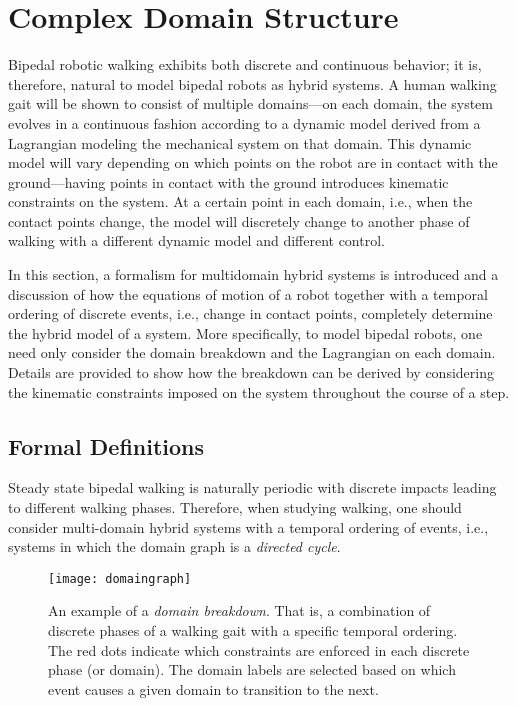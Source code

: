 \section{Complex Domain Structure}
Bipedal robotic walking exhibits both discrete and continuous behavior; it is,
therefore, natural to model bipedal robots as hybrid systems.
%
A human walking gait will be shown to consist of multiple domains---on each
domain, the system evolves in a continuous fashion according to a dynamic model
derived from a Lagrangian modeling the mechanical system on that domain.
%
This dynamic model will vary depending on which points on the robot are in
contact with the ground---having points in contact with the ground introduces
kinematic constraints on the system.
%
At a certain point in each domain, i.e., when the contact points change, the
model will discretely change to another phase of walking with a different
dynamic model and different control.
%

In this section, a formalism for multidomain hybrid systems is introduced and a
discussion of how the equations of motion of a robot together with a temporal
ordering of discrete events, i.e., change in contact points, completely
determine the hybrid model of a system.
%
More specifically, to model bipedal robots, one need only consider the domain
breakdown and the Lagrangian on each domain.
%
Details are provided to show how the breakdown can be derived by considering the
kinematic constraints imposed on the system throughout the course of a step.


\subsection{Formal Definitions}

Steady state bipedal walking is naturally periodic with discrete impacts leading
to different walking phases.
%
Therefore, when studying walking, one should consider multi-domain hybrid
systems with a temporal ordering of events, i.e., systems in which the domain
graph is a {\em directed cycle}.

\begin{figure}[t]
  \centering
  \texttt{[image: domaingraph]}
  \caption[An example of a {\em domain breakdown}.]{An example of a {\em domain
      breakdown}.
    That is, a combination of discrete phases of a walking gait with a specific
    temporal ordering. The red dots indicate which constraints are enforced in
    each discrete phase (or domain).
    The domain labels are selected based on which event causes a given domain to
    transition to the next.}
  \label{fig:domaingraph}
\end{figure}

